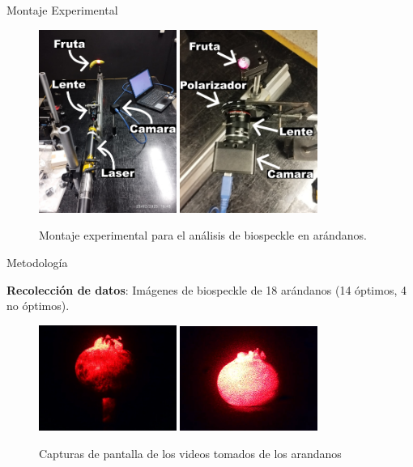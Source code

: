 \documentclass{beamer}
\begin{document}
\begin{frame}{Montaje Experimental}
    \begin{figure}
        \includegraphics[width=0.4\textwidth]{Bananaforscale.png}
        \includegraphics[width=0.4\textwidth]{arandalep.png}
        \caption{Montaje experimental para el análisis de biospeckle en arándanos.}
    \end{figure}
\end{frame}

\begin{frame}{Metodología}
    
    \textbf{Recolección de datos}: Imágenes de biospeckle de 18 arándanos (14 óptimos, 4 no óptimos).
    \begin{figure}
        \includegraphics[width=0.4\textwidth]{A5.png}
        \includegraphics[width=0.4\textwidth]{verde.png}
        \caption{Capturas de pantalla de los videos tomados de los arandanos}
    \end{figure}
\end{frame}
\end{document}
